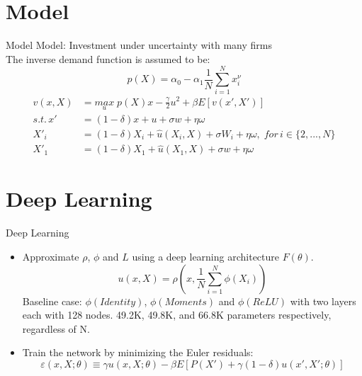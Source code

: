 \documentclass[dvipsnames,mathserif]{beamer}
\begin{document}
{\section{Model}
\begin{frame}{Model}
Model: Investment under uncertainty with many firms\\
The inverse demand function is assumed to be: \[p(X) = \alpha_0 - \alpha_1\frac{1}{N}\sum_{i=1}^{N}x_i^{\nu}\]
    \begin{align*}
    v(x,X) & = \underset{u}{max}\;{p(X)x - \frac{\gamma}{2}u^2 + \beta E[v(x',X')]}\\
    s.t. \, x'&= (1-\delta)x + u + \sigma w + \eta \omega\\
    X'_{i} &= (1-\delta)X_{i} + \hat{u}(X_{i},X) + \sigma W_{i} + \eta \omega, \; for \, i\in\{2,...,N\}\\
    X'_1 &= (1-\delta)X_1 + \hat{u}(X_1,X) + \sigma w + \eta \omega
    \end{align*}
\end{frame}

\section{Deep Learning}
\begin{frame}{Deep Learning}
    \begin{itemize}
        \item Approximate $\rho$, $\phi$ and $L$ using a deep learning architecture $F(\theta)$.
        \[u(x,X) = \rho(x,\frac{1}{N}\sum_{i=1}^{N}\phi(X_i))\]
        Baseline case: $\phi(Identity)$, $\phi(Moments)$ and $\phi(ReLU)$ with two layers each with 128 nodes. 49.2K, 49.8K, and 66.8K parameters respectively, regardless of N.
        \vspace{0.1cm}
        \item Train the network by minimizing the Euler residuals:
        \[\varepsilon(x,X;\theta) \equiv \gamma u(x,X;\theta) - \beta E[P(X') + \gamma (1-\delta)u(x',X';\theta)]\]
    \end{itemize}
\end{frame}



}
\end{document}
